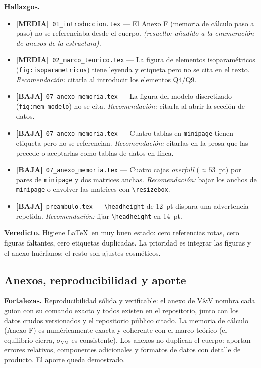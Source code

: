 \documentclass[11pt,a4paper]{article}
\newcommand{\sevmedia}{\textcolor{cMedia}{\textbf{[MEDIA]}}}
\newcommand{\sevbaja}{\textcolor{cBaja}{\textbf{[BAJA]}}}
\newcommand{\fileref}[1]{\texttt{\small #1}}
\begin{document}
\textbf{Hallazgos.}
\begin{itemize}
  \item \sevmedia\ \fileref{01\_introduccion.tex} — El Anexo F (memoria de cálculo paso a paso) no se referenciaba desde el cuerpo. \textit{(resuelto: añadido a la enumeración de anexos de la estructura).}
  \item \sevmedia\ \fileref{02\_marco\_teorico.tex} — La figura de elementos isoparamétricos (\fileref{fig:isoparametricos}) tiene leyenda y etiqueta pero no se cita en el texto. \textit{Recomendación:} citarla al introducir los elementos Q4/Q9.
  \item \sevbaja\ \fileref{07\_anexo\_memoria.tex} — La figura del modelo discretizado (\fileref{fig:mem-modelo}) no se cita. \textit{Recomendación:} citarla al abrir la sección de datos.
  \item \sevbaja\ \fileref{07\_anexo\_memoria.tex} — Cuatro tablas en \texttt{minipage} tienen etiqueta pero no se referencian. \textit{Recomendación:} citarlas en la prosa que las precede o aceptarlas como tablas de datos en línea.
  \item \sevbaja\ \fileref{07\_anexo\_memoria.tex} — Cuatro cajas \textit{overfull} ($\approx 53$~pt) por pares de \texttt{minipage} y dos matrices anchas. \textit{Recomendación:} bajar los anchos de \texttt{minipage} o envolver las matrices con \texttt{\textbackslash resizebox}.
  \item \sevbaja\ \fileref{preambulo.tex} — \texttt{\textbackslash headheight} de 12~pt dispara una advertencia repetida. \textit{Recomendación:} fijar \texttt{\textbackslash headheight} en 14~pt.
\end{itemize}

\textbf{Veredicto.} Higiene \LaTeX\ en muy buen estado: cero referencias rotas, cero figuras faltantes,
cero etiquetas duplicadas. La prioridad es integrar las figuras y el anexo huérfanos; el resto son
ajustes cosméticos.

\subsection{Anexos, reproducibilidad y aporte}

\textbf{Fortalezas.} Reproducibilidad sólida y verificable: el anexo de V\&V nombra cada guion con su
comando exacto y todos existen en el repositorio, junto con los datos crudos versionados y el
repositorio público citado. La memoria de cálculo (Anexo F) es numéricamente exacta y coherente con el
marco teórico (el equilibrio cierra, $\sigma_{\mathrm{VM}}$ es consistente). Los anexos no duplican el
cuerpo: aportan errores relativos, componentes adicionales y formatos de datos con detalle de producto.
El aporte queda demostrado.
\end{document}
